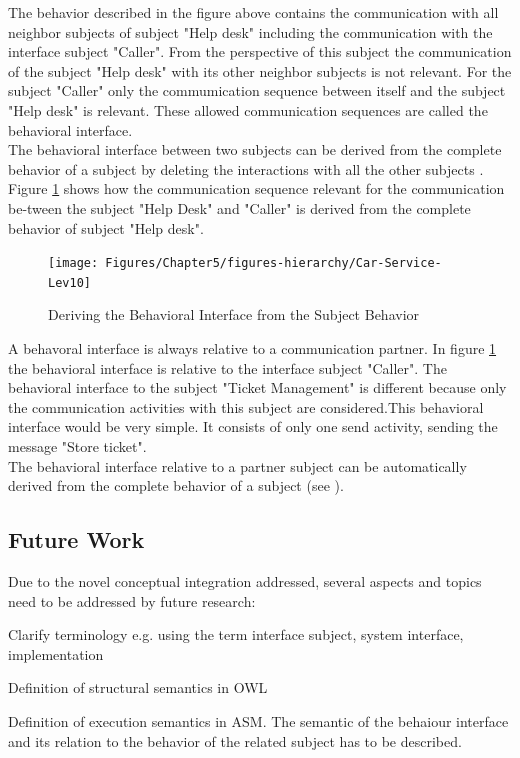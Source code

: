 The behavior described in the figure above contains the communication with all neighbor subjects of subject "Help desk" including the communication with the interface subject "Caller". From the perspective of this subject the communication of the subject "Help desk" with its other neighbor subjects is not relevant. For the subject "Caller" only the commumication sequence between itself and the subject "Help desk" is relevant. These allowed communication sequences are called the behavioral interface.\\
The behavioral interface between two subjects can be derived from the complete behavior of a subject by deleting the interactions with all the other subjects . Figure \ref{fig:car-service-lev10} shows how the communication sequence relevant for the communication be-tween the subject "Help Desk" and "Caller" is derived from the complete behavior of subject "Help desk".

\begin{figure}[htbp]
	\centering
	\texttt{[image: Figures/Chapter5/figures-hierarchy/Car-Service-Lev10]}
	\caption[Deriving the Behavioral Interface from the Subject Behavior]{Deriving the Behavioral Interface from the Subject Behavior}
	\label{fig:car-service-lev10}
\end{figure}

A behavoral interface is always relative to a communication partner. In figure \ref{fig:car-service-lev10} the behavioral interface is relative to the interface subject "Caller". The behavioral interface to the subject "Ticket Management" is different because only the communication activities with this subject are considered.This behavioral interface would be very simple. It consists of only one send activity, sending the message "Store ticket".\\
The behavioral interface relative to a partner subject can be automatically derived from the complete behavior of a subject
(see \cite{article:jCPEX}).

\subsection{Future Work}

Due to the novel conceptual integration addressed, several aspects and topics need to be addressed by future research:
\begin{list}{-}{spacing}
	\item Clarify terminology e.g. using the term interface subject, system interface, implementation
	\item Definition of structural semantics in OWL
	\item Definition of execution semantics in ASM. The semantic of the behaiour interface and its relation to the behavior of the related subject has to be described.
\end{list}


